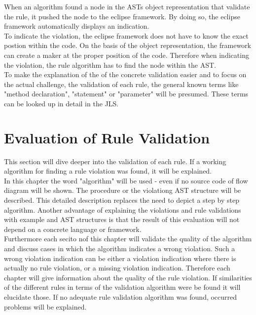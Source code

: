 When an algorithm found a node in the \acf{AST}s object representation that validate the rule, it pushed the node to the eclipse framework. By doing so, the eclipse framework automatically displays an indication. 
\\

To indicate the violation, the eclipse framework does not have to know the exact postion within the code. On the basis of the object representation, the framework can create a maker at the proper position of the code. Therefore when indicating the violation, the rule algorithm has to find the node within the \acf{AST}.
\\

To make the explanation of the of the concrete validation easier and to focus on the actual challenge, the validation of each rule, the general known terms like "method declaration", "statement" or "parameter" will be presumed. These terms can be looked up in detail in the \acf{JLS}\cite{jls}. 

\section{Evaluation of Rule Validation}
\label{e:evaluation}
This section will dive deeper into the validation of each rule. If a working algorithm for finding a rule violation was found, it will be explained.
\\

In this chapter the word "algorithm" will be used - even if no source code of flow diagram will be shown. The procedure or the violationg \acf{AST}  structure will be described. This detailed description replaces the need to depict a step by step algorithm. Another advantage of explaining the violations and rule validations with example and \acf{AST} structures is that the result of this evaluation will not depend on a concrete language or framework. 
\\

Furthermore each secito nof this chapter will validate the quality of the algorithm and discuss cases in which the algorithm indicates a wrong violation. Such a wrong violation indication can be either a violation indication where there is actually no rule violation, or a missing violation indication. Therefore each chapter will give information about the quality of the rule violation. If similarities of the different rules in terms of the validation algorithm were be found it will elucidate those. If no adequate rule validation algorithm was found, occurred problems will be explained.
\\

